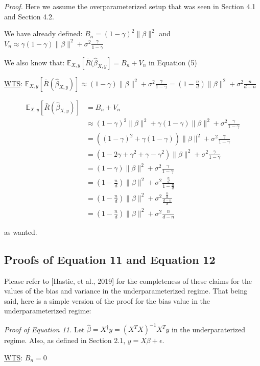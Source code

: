 \documentclass{article}
\begin{document}
\emph{Proof.}
Here we assume the overparameterized setup that was seen in Section 4.1 and Section 4.2.

We have already defined: 
$B_n = (1-\gamma)^2 \|\beta\|^2$ and 
$V_n \approx \gamma (1-\gamma) \|\beta\|^2 + \sigma^2 \frac{\gamma}{1-\gamma}$

We also know that: $\mathbb{E}_{X,y} [\bar{R} (\hat{\beta}_{X,y}] = B_n + V_n$ in Equation (5)

\underline{WTS}: $\mathbb{E}_{X,y} [\bar{R} (\hat{\beta}_{X,y})] \approx (1 - \gamma) \|\beta\|^2 + \sigma^2 \frac{\gamma}{1-\gamma} = (1- \frac{n}{d}) \|\beta\|^2 + \sigma^2 \frac{n}{d-n}$

\begin{align*}
    \mathbb{E}_{X,y} [\bar{R} (\hat{\beta}_{X,y})] &= B_n + V_n\\
    &\approx (1-\gamma)^2 \|\beta\|^2 + \gamma (1-\gamma) \|\beta\|^2 + \sigma^2 \frac{\gamma}{1-\gamma}\\
    &= ((1-\gamma)^2 + \gamma(1-\gamma)) \|\beta\|^2 + \sigma^2 \frac{\gamma}{1-\gamma}\\
    &= (1-2\gamma+\gamma^2+\gamma-\gamma^2)\|\beta\|^2 + \sigma^2 \frac{\gamma}{1-\gamma}\\
    &= (1-\gamma) \|\beta\|^2 + \sigma^2 \frac{\gamma}{1-\gamma}\\
    &= (1-\frac{n}{d}) \|\beta\|^2 + \sigma^2 \frac{\frac{n}{d}}{1-\frac{n}{d}}\\
    &= (1-\frac{n}{d}) \|\beta\|^2 + \sigma^2 \frac{\frac{n}{d}}{\frac{d-n}{d}}\\
    &= (1-\frac{n}{d}) \|\beta\|^2 + \sigma^2 \frac{n}{d-n}
\end{align*}

as wanted.

\subsection{Proofs of Equation 11 and Equation 12}

Please refer to [Hastie, et al., 2019] for the completeness of these claims for the values of the bias and variance in the underparameterized regime. That being said, here is a simple version of the proof for the bias value in the underparameterized regime:

\emph{Proof of Equation 11.}
Let $\hat{\beta} = X^{\dagger}y = (X^{T}X)^{-1}X^{T}y$ in the underparaterized regime. Also, as defined in Section 2.1, $y = X\beta + \epsilon$.

\underline{WTS}: $B_n = 0$
\end{document}
